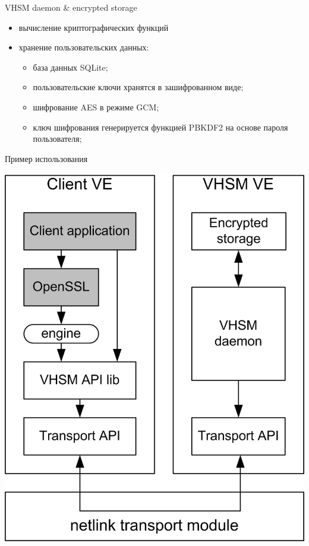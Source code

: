 \documentclass[utf8, 11pt]{beamer}
\begin{document}
\begin{frame}{VHSM daemon \& encrypted storage}

\begin{itemize}
\item вычисление криптографических функций
\item хранение пользовательских данных:
	\begin{itemize}
	\item база данных SQLite;
	\item пользовательские ключи хранятся в зашифрованном виде;
	\item шифрование AES в режиме GCM;
	\item ключ шифрования генерируется функцией PBKDF2 на основе пароля пользователя;
	\end{itemize}
\end{itemize}
\vspace*{\fill}
\end{frame}

\begin{frame}{Пример использования}
\begin{center}
\includegraphics[scale=0.75]{img3-2}
\end{center}
\end{frame}
\end{document}
